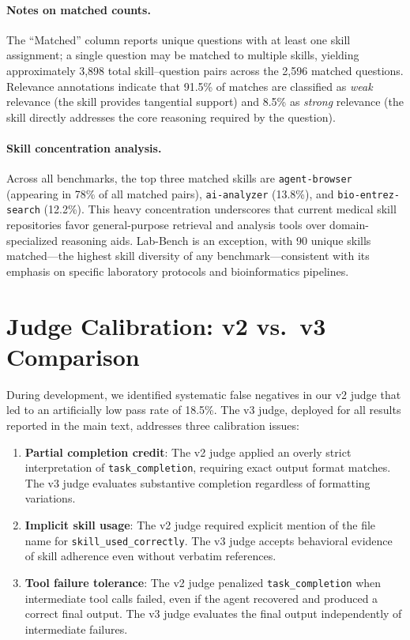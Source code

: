 \paragraph{Notes on matched counts.}
The ``Matched'' column reports unique questions with at least one skill assignment; a single question may be matched to multiple skills, yielding approximately 3,898 total skill--question pairs across the 2,596 matched questions.
Relevance annotations indicate that 91.5\% of matches are classified as \emph{weak} relevance (the skill provides tangential support) and 8.5\% as \emph{strong} relevance (the skill directly addresses the core reasoning required by the question).

\paragraph{Skill concentration analysis.}
Across all benchmarks, the top three matched skills are \texttt{agent-browser} (appearing in 78\% of all matched pairs), \texttt{ai-analyzer} (13.8\%), and \texttt{bio-entrez-search} (12.2\%).
This heavy concentration underscores that current medical skill repositories favor general-purpose retrieval and analysis tools over domain-specialized reasoning aids.
Lab-Bench is an exception, with 90 unique skills matched---the highest skill diversity of any benchmark---consistent with its emphasis on specific laboratory protocols and bioinformatics pipelines.


\section{Judge Calibration: v2 vs.\ v3 Comparison}
\label{app:judge_calibration}

During development, we identified systematic false negatives in our v2 judge that led to an artificially low pass rate of 18.5\%.
The v3 judge, deployed for all results reported in the main text, addresses three calibration issues:

\begin{enumerate}[nosep,leftmargin=*]
  \item \textbf{Partial completion credit}: The v2 judge applied an overly strict interpretation of \texttt{task\_completion}, requiring exact output format matches. The v3 judge evaluates substantive completion regardless of formatting variations.
  \item \textbf{Implicit skill usage}: The v2 judge required explicit mention of the \skillmd file name for \texttt{skill\_used\_correctly}. The v3 judge accepts behavioral evidence of skill adherence even without verbatim references.
  \item \textbf{Tool failure tolerance}: The v2 judge penalized \texttt{task\_completion} when intermediate tool calls failed, even if the agent recovered and produced a correct final output. The v3 judge evaluates the final output independently of intermediate failures.
\end{enumerate}

